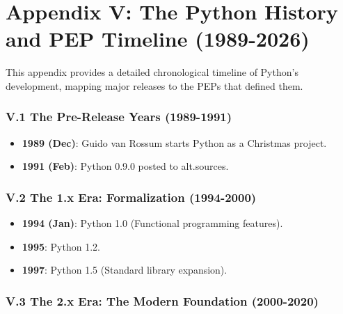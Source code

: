 \hypertarget{appendix-v-the-python-history-and-pep-timeline-1989-2026}{%
\chapter{Appendix V: The Python History and PEP Timeline
(1989-2026)}\label{appendix-v-the-python-history-and-pep-timeline-1989-2026}}

This appendix provides a detailed chronological timeline of Python's
development, mapping major releases to the PEPs that defined them.

\hypertarget{v.1-the-pre-release-years-1989-1991}{%
\subsection{V.1 The Pre-Release Years
(1989-1991)}\label{v.1-the-pre-release-years-1989-1991}}

\begin{itemize}
\tightlist
\item
  \textbf{1989 (Dec)}: Guido van Rossum starts Python as a Christmas
  project.
\item
  \textbf{1991 (Feb)}: Python 0.9.0 posted to alt.sources.
\end{itemize}

\hypertarget{v.2-the-1.x-era-formalization-1994-2000}{%
\subsection{V.2 The 1.x Era: Formalization
(1994-2000)}\label{v.2-the-1.x-era-formalization-1994-2000}}

\begin{itemize}
\tightlist
\item
  \textbf{1994 (Jan)}: Python 1.0 (Functional programming features).
\item
  \textbf{1995}: Python 1.2.
\item
  \textbf{1997}: Python 1.5 (Standard library expansion).
\end{itemize}

\hypertarget{v.3-the-2.x-era-the-modern-foundation-2000-2020}{%
\subsection{V.3 The 2.x Era: The Modern Foundation
(2000-2020)}\label{v.3-the-2.x-era-the-modern-foundation-2000-2020}}

